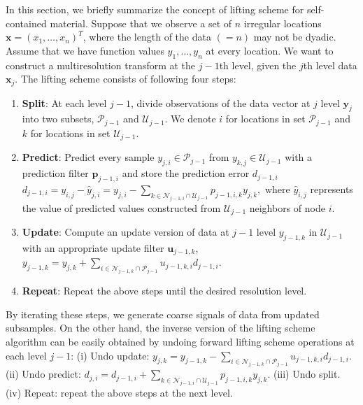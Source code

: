 \documentclass[11pt,titlepage]{article}
\begin{document}
In this section, we briefly summarize the concept of lifting scheme for self-contained material. Suppose that we observe a set of $n$ irregular locations $\bm{x}=(x_{1},\ldots, x_{n})^{T}$, where the length of the data $(=n)$ may not be dyadic. Assume that we have function values $y_1,\ldots, y_n$ at every location. We want to construct a multiresolution transform at the $j-1$th level, given the $j$th level data $\bm{x}_{j}$. The lifting scheme consists of following four steps:
\begin{enumerate}
	\item \textbf{Split}: At each level $j-1$, divide observations of the data vector at $j$ level $\bm{y}_{j}$ into two subsets, $\mathcal{P}_{j-1}$ and $\mathcal{U}_{j-1}$.  We denote $i$ for locations in set $\mathcal{P}_{j-1}$ and $k$ for locations in set $\mathcal{U}_{j-1}$.
	\item \textbf{Predict}: Predict every sample $y_{j,i}\in\mathcal{P}_{j-1}$ from $y_{k,j}\in\mathcal{U}_{j-1}$ with a prediction filter $\mathbf{p}_{j-1,i}$ and store the prediction error $d_{j-1,i}$ 
$d_{j-1,i} = y_{i,j} - \hat{y}_{j,i} = y_{j,i} - \sum_{k \in \mathcal{N}_{j-1,i}\cap \mathcal{U}_{j-1}}p_{j-1,i,k}y_{j,k},$
	where $\hat{y}_{i,j}$ represents the value of predicted values constructed from $\mathcal{U}_{j-1}$ neighbors of node $i$.
	\item \textbf{Update}: Compute an update version of data at $j-1$ level $y_{j-1,k}$ in $\mathcal{U}_{j-1}$ %
 with an appropriate update filter $\mathbf{u}_{j-1,k}$,
	$y_{j-1,k} = y_{j,k}+\sum_{i\in\mathcal{N}_{j-1,k}\cap \mathcal{P}_{j-1}}u_{j-1,k,i}d_{j-1,i}.$ 
	\item \textbf{Repeat}: Repeat the above steps until the desired resolution level.
\end{enumerate}

By iterating these steps, we generate coarse signals of data from updated subsamples. On the other hand, the inverse version of the lifting scheme algorithm can be easily obtained by undoing forward lifting scheme operations at each level $j-1$: (i) Undo update: $ y_{j,k} = y_{j-1,k} - \sum_{i\in\mathcal{N}_{j-1,k}\cap \mathcal{P}_{j-1}}u_{j-1,k,i}d_{j-1,i}.$ (ii) Undo predict: $d_{j,i} = d_{j-1,i} + \sum_{k\in\mathcal{N}_{j-1,i}\cap \mathcal{U}_{j-1}}p_{j-1,i,k}y_{j,k}.$ (iii) Undo split. (iv) Repeat: repeat the above steps at the next level.
\end{document}

